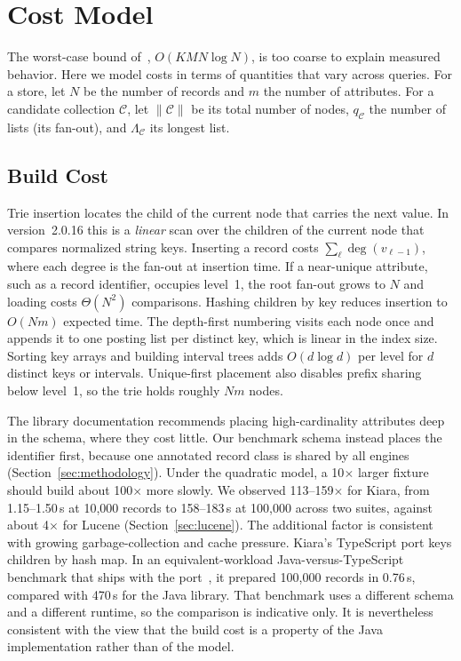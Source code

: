 \section{Cost Model}
\label{sec:cost}

The worst-case bound of~\cite{kapoor2020efficient}, $O(KMN\log N)$, is too coarse to explain measured behavior. Here we model costs in terms of quantities that vary across queries. For a store, let $N$ be the number of records and $m$ the number of attributes. For a candidate collection $\mathcal{C}$, let $\|\mathcal{C}\|$ be its total number of nodes, $q_{\mathcal{C}}$ the number of lists (its fan-out), and $\Lambda_{\mathcal{C}}$ its longest list.

\subsection{Build Cost}
Trie insertion locates the child of the current node that carries the next value. In version~2.0.16 this is a \emph{linear} scan over the children of the current node that compares normalized string keys. Inserting a record costs $\sum_{\ell}\deg(v_{\ell-1})$, where each degree is the fan-out at insertion time. If a near-unique attribute, such as a record identifier, occupies level~1, the root fan-out grows to $N$ and loading costs $\Theta(N^2)$ comparisons. Hashing children by key reduces insertion to $O(Nm)$ expected time. The depth-first numbering visits each node once and appends it to one posting list per distinct key, which is linear in the index size. Sorting key arrays and building interval trees adds $O(d\log d)$ per level for $d$ distinct keys or intervals. Unique-first placement also disables prefix sharing below level~1, so the trie holds roughly $Nm$ nodes.

The library documentation recommends placing high-cardinality attributes deep in the schema, where they cost little. Our benchmark schema instead places the identifier first, because one annotated record class is shared by all engines (Section~\ref{sec:methodology}). Under the quadratic model, a 10$\times$ larger fixture should build about 100$\times$ more slowly. We observed 113--159$\times$ for Kiara, from 1.15--1.50\,s at 10{,}000 records to 158--183\,s at 100{,}000 across two suites, against about 4$\times$ for Lucene (Section~\ref{sec:lucene}). The additional factor is consistent with growing garbage-collection and cache pressure. Kiara's TypeScript port keys children by hash map. In an equivalent-workload Java-versus-TypeScript benchmark that ships with the port~\cite{kiarats2026software}, it prepared 100{,}000 records in 0.76\,s, compared with 470\,s for the Java library. That benchmark uses a different schema and a different runtime, so the comparison is indicative only. It is nevertheless consistent with the view that the build cost is a property of the Java implementation rather than of the model.

